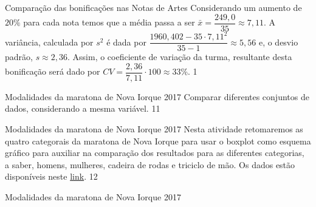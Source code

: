 {{{\begin{answer}{Comparação das bonificações nas Notas de Artes}
{Considerando um aumento de $20\%$ para cada nota temos que a média passa a ser $\bar{x}=\dfrac{249{,}0}{35}\approx7{,}11$. A variância, calculada por $s^2$ é dada por $\dfrac{1960{,}402-35\cdot7{,}11^2}{35-1}\approx5{,}56$ e, o desvio padrão, $s\approx2{,}36$. Assim, o coeficiente de variação da turma, resultante desta bonificação será dado por $CV=\dfrac{2{,}36}{7{,}11}\cdot100\approx33$\%.
}{1}
\end{answer}
\begin{objectives}{Modalidades da maratona de Nova Iorque 2017}
{
 Comparar diferentes conjuntos de dados, considerando a mesma variável.
}{1}{1}
\end{objectives}
\begin{sugestions}{Modalidades da maratona de Nova Iorque 2017}
{
Nesta atividade retomaremos as quatro categorais da maratona de Nova Iorque para usar o boxplot como esquema gráfico para auxiliar na comparação dos resultados para as diferentes categorias, a saber, homens, mulheres, cadeira de rodas e triciclo de mão. Os dados estão disponíveis neste \href{https://ggbm.at/ZhqKD9Nz}{link}.
}{1}{2}
\end{sugestions}
\begin{answer}{Modalidades da maratona de Nova Iorque 2017}
{
}
\end{answer}}}}
